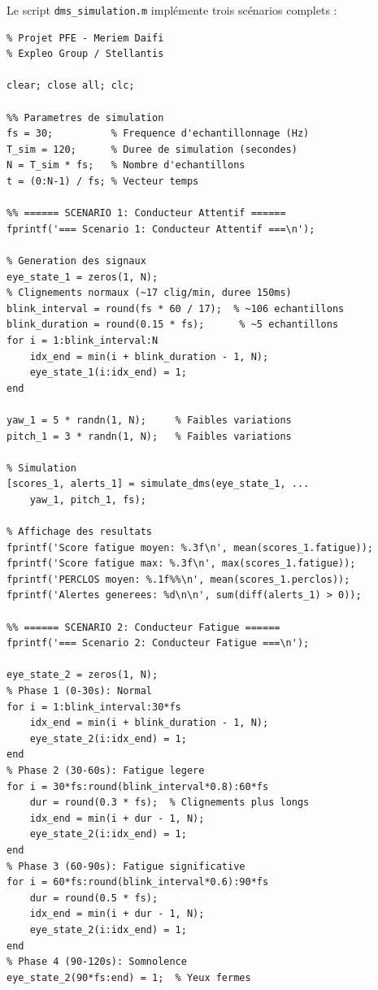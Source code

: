 \documentclass[12pt,a4paper,twoside]{report}
\begin{document}
Le script \texttt{dms\_simulation.m} implémente trois scénarios complets :

\begin{lstlisting}[style=matlabstyle, caption={Script principal de simulation DMS en MATLAB.}, label={lst:simulation_matlab}]
%% Simulation DMS - Script Principal
% Projet PFE - Meriem Daifi
% Expleo Group / Stellantis

clear; close all; clc;

%% Parametres de simulation
fs = 30;          % Frequence d'echantillonnage (Hz)
T_sim = 120;      % Duree de simulation (secondes)
N = T_sim * fs;   % Nombre d'echantillons
t = (0:N-1) / fs; % Vecteur temps

%% ====== SCENARIO 1: Conducteur Attentif ======
fprintf('=== Scenario 1: Conducteur Attentif ===\n');

% Generation des signaux
eye_state_1 = zeros(1, N);
% Clignements normaux (~17 clig/min, duree 150ms)
blink_interval = round(fs * 60 / 17);  % ~106 echantillons
blink_duration = round(0.15 * fs);      % ~5 echantillons
for i = 1:blink_interval:N
    idx_end = min(i + blink_duration - 1, N);
    eye_state_1(i:idx_end) = 1;
end

yaw_1 = 5 * randn(1, N);     % Faibles variations
pitch_1 = 3 * randn(1, N);   % Faibles variations

% Simulation
[scores_1, alerts_1] = simulate_dms(eye_state_1, ...
    yaw_1, pitch_1, fs);

% Affichage des resultats
fprintf('Score fatigue moyen: %.3f\n', mean(scores_1.fatigue));
fprintf('Score fatigue max: %.3f\n', max(scores_1.fatigue));
fprintf('PERCLOS moyen: %.1f%%\n', mean(scores_1.perclos));
fprintf('Alertes generees: %d\n\n', sum(diff(alerts_1) > 0));

%% ====== SCENARIO 2: Conducteur Fatigue ======
fprintf('=== Scenario 2: Conducteur Fatigue ===\n');

eye_state_2 = zeros(1, N);
% Phase 1 (0-30s): Normal
for i = 1:blink_interval:30*fs
    idx_end = min(i + blink_duration - 1, N);
    eye_state_2(i:idx_end) = 1;
end
% Phase 2 (30-60s): Fatigue legere
for i = 30*fs:round(blink_interval*0.8):60*fs
    dur = round(0.3 * fs);  % Clignements plus longs
    idx_end = min(i + dur - 1, N);
    eye_state_2(i:idx_end) = 1;
end
% Phase 3 (60-90s): Fatigue significative
for i = 60*fs:round(blink_interval*0.6):90*fs
    dur = round(0.5 * fs);
    idx_end = min(i + dur - 1, N);
    eye_state_2(i:idx_end) = 1;
end
% Phase 4 (90-120s): Somnolence
eye_state_2(90*fs:end) = 1;  % Yeux fermes


\end{lstlisting}
\end{document}
